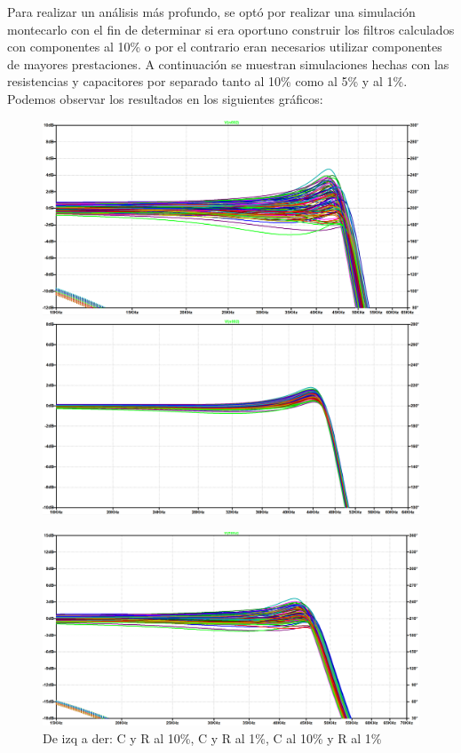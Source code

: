 \documentclass[../../ASSD_TP1_G7.tex]{subfiles}
\begin{document}
Para realizar un análisis más profundo, se optó por realizar una simulación
montecarlo con el fin de determinar si era oportuno construir los
filtros calculados con componentes al 10\% o por el contrario eran
necesarios utilizar componentes de mayores prestaciones. A continuación
se muestran simulaciones hechas con las resistencias y capacitores
por separado tanto al 10\% como al 5\% y al 1\%. Podemos observar
los resultados en los siguientes gráficos:

\begin{figure}[H]
\begin{center}

\includegraphics[scale=0.27]{Imagenes/CyR_al_5.PNG}\includegraphics[scale=0.27]{Imagenes/CyR_al_1.PNG}


\includegraphics[scale=0.27]{Imagenes/C_al_1_yR_al_5.PNG}

\par\end{center}
\caption{De izq a der: C y R al 10\%, C y R al 1\%, C al 10\% y R al 1\%}
\label{fig:montecarlo}
\end{figure}
\end{document}
